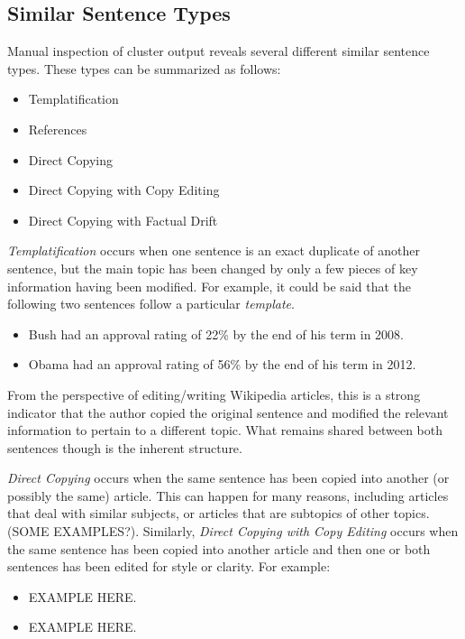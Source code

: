 \documentclass{acm_proc_article-sp}
\begin{document}
\subsection{Similar Sentence Types}

Manual inspection of cluster output reveals several different similar sentence types. These types can be summarized as follows:

\begin{itemize}
\item Templatification
\item References
\item Direct Copying
\item Direct Copying with Copy Editing
\item Direct Copying with Factual Drift
\end{itemize}

 \emph{Templatification} occurs when one sentence is an exact duplicate of another sentence, but the main topic has been changed by only a few pieces of key information having been modified. For example, it could be said that the following two sentences follow a particular \emph{template}.
\begin{itemize}[noitemsep,nolistsep]
\item Bush had an approval rating of 22\% by the end of his term in 2008.
\item Obama had an approval rating of 56\% by the end of his term in 2012.

\end{itemize}
From the perspective of editing/writing Wikipedia articles, this is a strong indicator that the author copied the original sentence and modified the relevant information to pertain to a different topic. What remains shared between both sentences though is the inherent structure.

\emph{Direct Copying} occurs when the same sentence has been copied into another (or possibly the same) article. This can happen for many reasons, including articles that deal with similar subjects, or articles that are subtopics of other topics. (SOME EXAMPLES?). Similarly, \emph{Direct Copying with Copy Editing} occurs when the same sentence has been copied into another article and then one or both sentences has been edited for style or clarity. For example:
\begin{itemize}[noitemsep,nolistsep]
\item EXAMPLE HERE.
\item EXAMPLE HERE.
\end{itemize}
\end{document}
